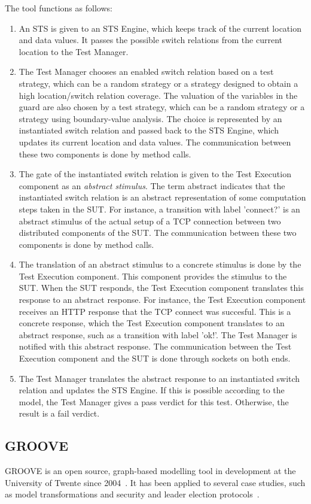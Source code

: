 The tool functions as follows: 
\begin{enumerate}
  \item An STS is given to an STS Engine, which keeps track of the current location and data values. It passes the possible switch relations from the current location to the Test Manager.
  \item The Test Manager chooses an enabled switch relation based on a test strategy, which can be a random strategy or a strategy designed to obtain a high location/switch relation coverage. The valuation of the variables in the guard are also chosen by a test strategy, which can be a random strategy or a strategy using boundary-value analysis. The choice is represented by an instantiated switch relation and passed back to the STS Engine, which updates its current location and data values. The communication between these two components is done by method calls.
  \item The gate of the instantiated switch relation is given to the Test Execution component as an \textit{abstract stimulus}. The term abstract indicates that the instantiated switch relation is an abstract representation of some computation steps taken in the SUT. For instance, a transition with label 'connect?' is an abstract stimulus of the actual setup of a TCP connection between two distributed components of the SUT. The communication between these two components is done by method calls.
  \item The translation of an abstract stimulus to a concrete stimulus is done by the Test Execution component. This component provides the stimulus to the SUT. When the SUT responds, the Test Execution component translates this response to an abstract response. For instance, the Test Execution component receives an HTTP response that the TCP connect was succesful. This is a concrete response, which the Test Execution component translates to an abstract response, such as a transition with label 'ok!'. The Test Manager is notified with this abstract response. The communication between the Test Execution component and the SUT is done through sockets on both ends.
  \item The Test Manager translates the abstract response to an instantiated switch relation and updates the STS Engine. If this is possible according to the model, the Test Manager gives a pass verdict for this test. Otherwise, the result is a fail verdict.
\end{enumerate}

\subsection{GROOVE}\label{sec:descriptiongroove}
GROOVE is an open source, graph-based modelling tool in development at the University of Twente since 2004~\cite{Rensink:GROOVE}. It has been applied to several case studies, such as model transformations and security and leader election protocols~\cite{Ghamarian:GROOVE}.

